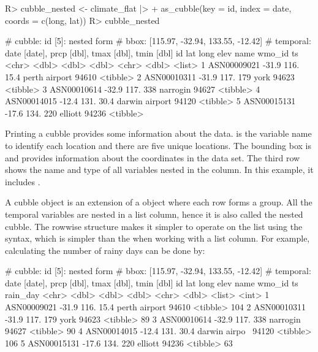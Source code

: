 \documentclass[
]{jss}
\begin{document}
\begin{CodeChunk}
\begin{CodeInput}
R> cubble_nested <- climate_flat |>
+   as_cubble(key = id, index = date, coords = c(long, lat))
R> cubble_nested
\end{CodeInput}
\begin{CodeOutput}
# cubble:   id [5]: nested form
# bbox:     [115.97, -32.94, 133.55, -12.42]
# temporal: date [date], prcp [dbl], tmax [dbl], tmin [dbl]
  id            lat  long  elev name           wmo_id ts      
  <chr>       <dbl> <dbl> <dbl> <chr>           <dbl> <list>  
1 ASN00009021 -31.9  116.  15.4 perth airport   94610 <tibble>
2 ASN00010311 -31.9  117. 179   york            94623 <tibble>
3 ASN00010614 -32.9  117. 338   narrogin        94627 <tibble>
4 ASN00014015 -12.4  131.  30.4 darwin airport  94120 <tibble>
5 ASN00015131 -17.6  134. 220   elliott         94236 <tibble>
\end{CodeOutput}
\end{CodeChunk}

Printing a cubble provides some information about the data.  is the variable name to identify each location and there are five unique locations. The bounding box is \code{[115.97, -32.94, 133.55, -12.42]} and provides information about the coordinates in the data set. The third row shows the name and type of all variables nested in the  column. In this example, it includes .

A cubble object is an extension of a  object where each row forms a group. All the temporal variables are nested in a list column, hence it is also called the nested cubble. The rowwise structure makes it simpler to operate on the list using the  syntax, which is simpler than the  when working with a list column. For example, calculating the number of rainy days can be done by:

\begin{CodeChunk}
\begin{CodeOutput}
# cubble:   id [5]: nested form
# bbox:     [115.97, -32.94, 133.55, -12.42]
# temporal: date [date], prcp [dbl], tmax [dbl], tmin [dbl]
  id            lat  long  elev name          wmo_id ts       rain_day
  <chr>       <dbl> <dbl> <dbl> <chr>          <dbl> <list>      <int>
1 ASN00009021 -31.9  116.  15.4 perth airport  94610 <tibble>      104
2 ASN00010311 -31.9  117. 179   york           94623 <tibble>       89
3 ASN00010614 -32.9  117. 338   narrogin       94627 <tibble>       90
4 ASN00014015 -12.4  131.  30.4 darwin airpo~  94120 <tibble>      106
5 ASN00015131 -17.6  134. 220   elliott        94236 <tibble>       63
\end{CodeOutput}
\end{CodeChunk}
\end{document}
